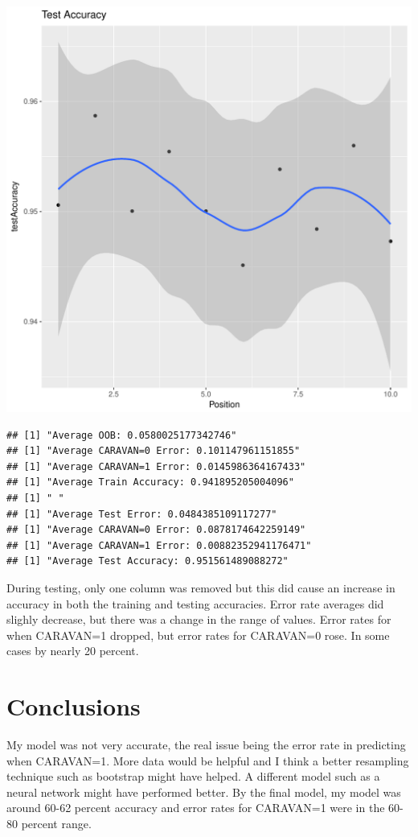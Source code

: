 \documentclass{article}\usepackage[]{graphicx}\usepackage[]{color}
\makeatletter
\def\maxwidth{ %
  \ifdim\Gin@nat@width>\linewidth
    \linewidth
  \else
    \Gin@nat@width
  \fi
}
\newenvironment{kframe}{%
 \def\at@end@of@kframe{}%
 \ifinner\ifhmode%
  \def\at@end@of@kframe{\end{minipage}}%
  \begin{minipage}{\columnwidth}%
 \fi\fi%
 \def\FrameCommand##1{\hskip\@totalleftmargin \hskip-\fboxsep
 \colorbox{shadecolor}{##1}\hskip-\fboxsep
     \hskip-\linewidth \hskip-\@totalleftmargin \hskip\columnwidth}%
 \MakeFramed {\advance\hsize-\width
   \@totalleftmargin\z@ \linewidth\hsize
   \@setminipage}}%
 {\par\unskip\endMakeFramed%
 \at@end@of@kframe}
\newenvironment{knitrout}{}{} %
\makeatother
\begin{document}
\begin{knitrout}
\begin{kframe}
{\ttfamily\noindent\itshape\color{messagecolor}{\#\# `geom\_smooth()` using method = 'loess'}}\end{kframe}
\includegraphics[width=\maxwidth]{figure/unnamed-chunk-43-8} 
\begin{kframe}\begin{verbatim}
## [1] "Average OOB: 0.0580025177342746"
## [1] "Average CARAVAN=0 Error: 0.101147961151855"
## [1] "Average CARAVAN=1 Error: 0.0145986364167433"
## [1] "Average Train Accuracy: 0.941895205004096"
## [1] " "
## [1] "Average Test Error: 0.0484385109117277"
## [1] "Average CARAVAN=0 Error: 0.0878174642259149"
## [1] "Average CARAVAN=1 Error: 0.00882352941176471"
## [1] "Average Test Accuracy: 0.951561489088272"
\end{verbatim}
\end{kframe}
\end{knitrout}
During testing, only one column was removed but this did cause an increase in accuracy in both the training and testing accuracies. Error rate averages did slighly decrease, but there was a change in the range of values. Error rates for when CARAVAN=1 dropped, but error rates for CARAVAN=0 rose. In some cases by nearly 20 percent. 
\section{Conclusions}
My model was not very accurate, the real issue being the error rate in predicting when CARAVAN=1. More data would be helpful and I think a better resampling technique such as bootstrap might have helped. A different model such as a neural network might have performed better. By the final model, my model was around 60-62 percent accuracy and error rates for CARAVAN=1 were in the 60-80 percent range. 
\end{document}
